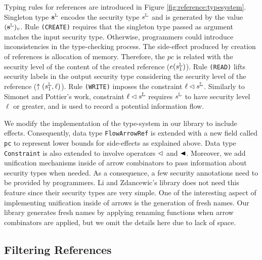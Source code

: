 \documentclass[times, 10pt,twocolumn]{article}
\begin{document}
Typing rules for references are introduced in 
Figure \ref{fig:reference:typesystem}. 
Singleton type $\mathbf{s^{\mathbb{L}}}$ encodes the security 
type $s^{\mathbb{L}}$ and is generated by the value $(\mathbf{s^{\mathbb{L}}})_v$.
Rule \texttt{(CREATE)} requires that the singleton type 
passed as argument matches the input security type. Otherwise, 
programmers could introduce inconsistencies in the 
type-checking process. 
The side-effect produced by creation of references is allocation 
of memory. Therefore, the $pc$ is related with the security 
level of the content of the created reference ($e(s^{\mathbb{L}}_1)$). Rule \texttt{(READ)} lifts 
security labels in the output security type considering the security 
level of the reference ($\uparrow (s_{1}^{\mathbb{L}}, \ell)$). 
Rule \texttt{(WRITE)} imposes the constraint $\ell\lhd s^{\mathbb{L}}$. 
Similarly to Simonet and Pottier's
work, constraint $\ell \lhd s^{\mathbb{L}}$ requires $s^{\mathbb{L}}$ to have 
security level $\ell$ or greater, and is used to record a 
potential information flow. 

We modify the implementation of the type-system in our library to include effects. 
Consequently, data type \texttt{FlowArrowRef} is extended with a new field 
called \texttt{pc} to represent lower bounds for side-effects as explained
above. Data type \texttt{Constraint} is also extended to 
involve operators $\lhd$ and $\sleql$. Moreover, we add 
unification mechanisms inside of arrow combinators to pass  
information about security types when needed. As a consequence, 
a few security annotations need to be provided by programmers. 
Li and Zdancewic's library does not need this feature since  
their security types are very simple. One of the interesting 
aspect of implementing unification inside of arrows is 
the generation of fresh names. Our library generates fresh names 
by applying renaming functions when arrow combinators are applied, 
but we omit the details here due to lack of space.



%



\subsection{Filtering References} \label{sec:proyections}
\end{document}
